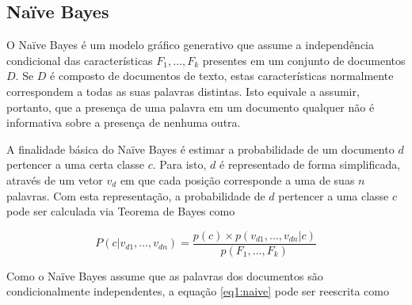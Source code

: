 

\subsection{Naïve Bayes}
\label{subsection:naive}

O Naïve Bayes é um modelo gráfico generativo que assume a independência condicional das características \ensuremath{F_1, ..., F_k} presentes em um conjunto de documentos \ensuremath{D}. Se \ensuremath{D} é composto de documentos de texto, estas características normalmente correspondem a todas as suas palavras distintas. Isto equivale a assumir, portanto, que a presença de uma palavra em um documento qualquer não é informativa sobre a presença de nenhuma outra. 

A finalidade básica do Naïve Bayes é estimar a probabilidade de um documento \ensuremath{d} pertencer a uma certa classe \ensuremath{c}. Para isto, \ensuremath{d} é representado de forma simplificada, através de um vetor \ensuremath{v_d} em que cada posição corresponde a uma de suas \ensuremath{n} palavras. Com esta representação, a probabilidade de \ensuremath{d} pertencer a uma classe \ensuremath{c} pode ser calculada via Teorema de Bayes como


\begin{equation}
\label{eq1:naive}
\ensuremath{P(c | v_{d1}, ..., v_{dn}) = \frac{p(c) \times p(v_{d1}, ..., v_{dn} | c)}{p(F_1, ..., F_k)} }
\end{equation}

Como o Naïve Bayes assume que as palavras dos documentos são condicionalmente independentes, a equação \ref{eq1:naive} pode ser reescrita como 

